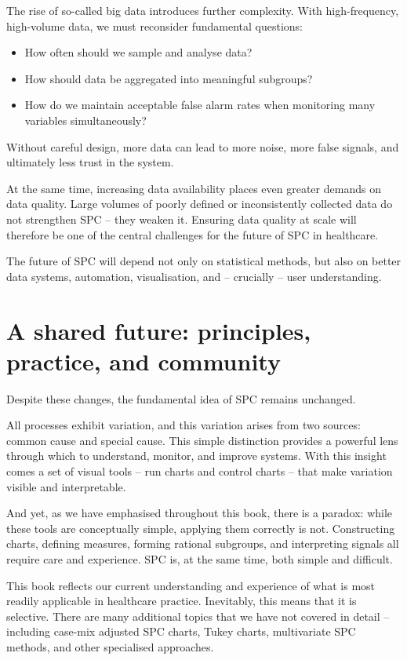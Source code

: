 \documentclass[
]{book}
\providecommand{\tightlist}{%
  \setlength{\itemsep}{0pt}\setlength{\parskip}{0pt}}
\begin{document}
The rise of so-called big data introduces further complexity. With
high-frequency, high-volume data, we must reconsider fundamental
questions:

\begin{itemize}
\tightlist
\item
  How often should we sample and analyse data?
\item
  How should data be aggregated into meaningful subgroups?
\item
  How do we maintain acceptable false alarm rates when monitoring many
  variables simultaneously?
\end{itemize}

Without careful design, more data can lead to more noise, more false
signals, and ultimately less trust in the system.

At the same time, increasing data availability places even greater
demands on data quality. Large volumes of poorly defined or
inconsistently collected data do not strengthen SPC -- they weaken it.
Ensuring data quality at scale will therefore be one of the central
challenges for the future of SPC in healthcare.

The future of SPC will depend not only on statistical methods, but also
on better data systems, automation, visualisation, and -- crucially --
user understanding.

\section{A shared future: principles, practice, and
community}\label{a-shared-future-principles-practice-and-community}

Despite these changes, the fundamental idea of SPC remains unchanged.

All processes exhibit variation, and this variation arises from two
sources: common cause and special cause. This simple distinction
provides a powerful lens through which to understand, monitor, and
improve systems. With this insight comes a set of visual tools -- run
charts and control charts -- that make variation visible and
interpretable.

And yet, as we have emphasised throughout this book, there is a paradox:
while these tools are conceptually simple, applying them correctly is
not. Constructing charts, defining measures, forming rational subgroups,
and interpreting signals all require care and experience. SPC is, at the
same time, both simple and difficult.

This book reflects our current understanding and experience of what is
most readily applicable in healthcare practice. Inevitably, this means
that it is selective. There are many additional topics that we have not
covered in detail -- including case-mix adjusted SPC charts, Tukey
charts, multivariate SPC methods, and other specialised approaches.
\end{document}
